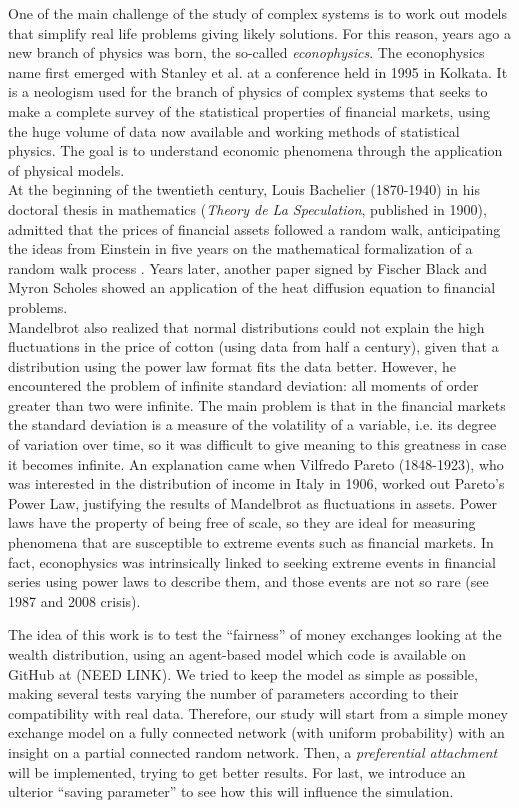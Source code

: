 One of the main challenge of the study of complex systems is to work out models that simplify real life problems giving likely solutions.
For this reason, years ago a new branch of physics was born, the so-called \emph{econophysics}.
The econophysics name first emerged with Stanley et al. at a conference held in 1995 in Kolkata.
It is a neologism used for the branch of physics of complex systems that seeks to make a complete survey of the statistical properties of financial markets, using the huge volume of data now available and working methods of statistical physics.
The goal is to understand economic phenomena through the application of physical models. \\
At the beginning of the twentieth century, Louis Bachelier (1870-1940) in his doctoral thesis in mathematics (\emph{Theory de La Speculation}, published in 1900), admitted that the prices of financial assets followed a random walk, anticipating the ideas from Einstein in five years on the mathematical formalization of a random walk process \cite{history}.
Years later, another paper signed by Fischer Black and Myron Scholes showed an application of the heat diffusion equation to financial problems. \\
Mandelbrot \cite{mandelbrot1965} also realized that normal distributions could not explain the high fluctuations in the price of cotton (using data from half a century), given that a distribution using the power law format fits the data better.  
However, he encountered the problem of infinite standard deviation: all moments of order greater than two were infinite.
The main problem is that in the financial markets the standard deviation is a measure of the volatility of a variable, i.e. its degree of variation over time, so it was difficult to give meaning to this greatness in case it becomes infinite.
An explanation came when Vilfredo Pareto (1848-1923), who was interested in the distribution of income in Italy in 1906, worked out Pareto's Power Law, justifying the results of Mandelbrot as fluctuations in assets.
Power laws have the property of being free of scale, so they are ideal for measuring phenomena that are susceptible to extreme events such as financial markets.
In fact, econophysics was intrinsically linked to seeking extreme events in financial series using power laws to describe them, and those events are not so rare (see 1987 and 2008 crisis).

The idea of this work is to test the ``fairness'' of money exchanges looking at the wealth distribution, using an agent-based model which code is available on GitHub at (NEED LINK).
We tried to keep the model as simple as possible, making several tests varying the number of parameters according to their compatibility with real data.
Therefore, our study will start from a simple money exchange model on a fully connected network (with uniform probability) with an insight on a partial connected random network.
Then, a \emph{preferential attachment} will be implemented, trying to get better results.
For last, we introduce an ulterior ``saving parameter'' to see how this will influence the simulation.